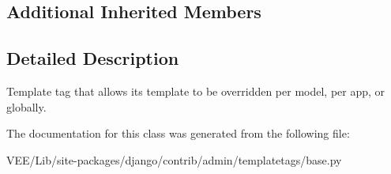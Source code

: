\subsection*{Additional Inherited Members}


\subsection{Detailed Description}
\begin{DoxyVerb}Template tag that allows its template to be overridden per model, per app,
or globally.
\end{DoxyVerb}
 

The documentation for this class was generated from the following file\+:\begin{DoxyCompactItemize}
\item 
V\+E\+E/\+Lib/site-\/packages/django/contrib/admin/templatetags/base.\+py\end{DoxyCompactItemize}
